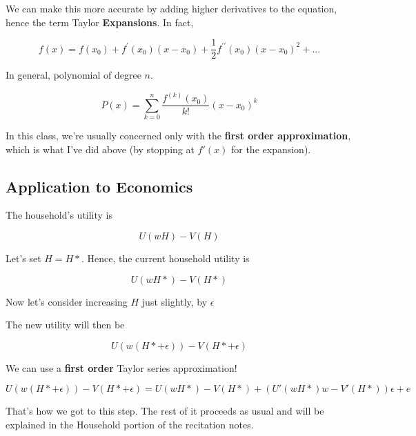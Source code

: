 \documentclass[11pt]{scrartcl}
\begin{document}
We can make this more accurate by adding higher derivatives to the equation, hence the term Taylor \textbf{Expansions}. In fact,

\[ f(x)=f(x_{0})+f^{' }(x_{0})(x-x_{0})+\frac{1}{2}f^{' '}(x_{0})(x-x_{0})^{2}+... \]

In general, polynomial of degree $n$.

\[P(x)=\sum_{k=0}^n \frac{f^{(k)}(x_{0})}{k!} (x-x_0)^k \]

In this class, we're usually concerned only with the \textbf{first order approximation}, which is what I've did above (by stopping at $f'(x)$ for the expansion).

\subsection{Application to Economics}

The household's utility is

\[U(wH) - V(H)\]

Let's set $H = H*$. Hence, the current household utility is

\[U(wH*) - V(H*)\]

Now let's consider increasing $H$ just slightly, by $\epsilon$

The new utility will then be

\[U(w(H*+\epsilon)) - V(H*+\epsilon) \]

We can use a \textbf{first order} Taylor series approximation!

\[ U(w(H*+\epsilon)) - V(H*+\epsilon) = U(wH*) - V(H*) + (U' (wH*)w - V'(H*))\epsilon + e\]

That's how we got to this step. The rest of it proceeds as usual and will be explained in the Household portion of the recitation notes.
\end{document}
